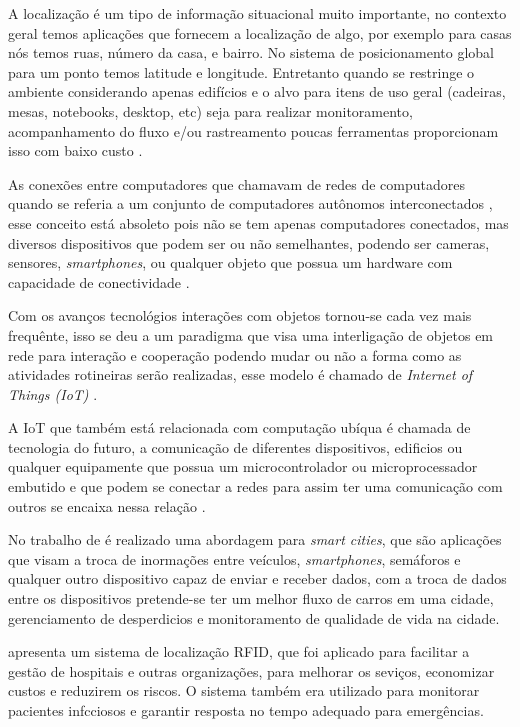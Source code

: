 
A localização é um tipo de informação situacional muito importante, no contexto geral temos aplicações que fornecem a 
localização de algo, por exemplo para casas nós temos ruas, número da casa, e bairro. No sistema de posicionamento global 
para um ponto temos latitude e longitude. Entretanto quando se restringe o ambiente considerando apenas edifícios e o 
alvo para itens de uso geral (cadeiras, mesas, notebooks, desktop, etc) seja para realizar monitoramento, acompanhamento do 
fluxo e/ou rastreamento poucas ferramentas proporcionam isso com baixo custo \cite{rfid2009review}.


As conexões entre computadores que chamavam de 
redes de computadores quando se referia a um conjunto de computadores autônomos interconectados \cite{tenenbaum2002}, 
esse conceito está absoleto pois não se tem apenas computadores conectados, mas diversos dispositivos que podem ser ou 
não semelhantes, podendo ser cameras, sensores, \textit{smartphones}, ou qualquer objeto que possua um 
hardware com capacidade de conectividade \cite{iot2016SBRC}.


Com os avanços tecnológios interações com objetos tornou-se cada vez mais frequênte, isso se deu a um paradigma 
que visa uma interligação de objetos em rede para interação e cooperação podendo mudar ou não a forma como as atividades 
rotineiras serão realizadas, esse modelo é chamado de \textit{Internet of Things (IoT)} \cite{realtimeRFID2016}.


A IoT que também está relacionada com computação ubíqua é chamada de tecnologia do futuro, a comunicação de diferentes dispositivos, 
edificios ou qualquer equipamente que possua um microcontrolador ou microprocessador embutido e que podem se conectar a 
redes para assim ter uma comunicação com outros se encaixa nessa relação 
\cite{mechanismRFID2006}.


No trabalho de  é realizado uma abordagem para \textit{smart cities}, que são 
aplicações que visam a troca de inormações entre veículos, \textit{smartphones}, semáforos e qualquer 
outro dispositivo capaz de enviar e receber dados, com a troca de dados entre os dispositivos pretende-se 
ter um melhor fluxo de carros em uma cidade, gerenciamento de desperdicios e monitoramento de qualidade de vida na cidade. 


 apresenta um sistema de localização RFID, que foi aplicado para facilitar a gestão de 
hospitais e outras organizações, para melhorar os seviços, economizar custos e reduzirem os riscos. O sistema também era 
utilizado para monitorar pacientes infcciosos e garantir resposta no tempo adequado para emergências.


